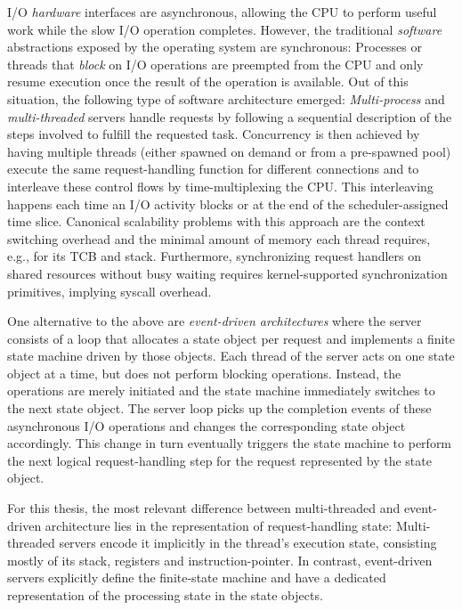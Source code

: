 \documentclass[12pt,a4paper]{book}
\begin{document}
I/O \emph{hardware} interfaces are asynchronous, allowing the CPU to perform useful work while the slow I/O operation completes.
However, the traditional \emph{software} abstractions exposed by the operating system are synchronous:
Processes or threads that \emph{block} on I/O operations are preempted from the CPU and only resume execution once the result of the operation is available.
Out of this situation, the following type of software architecture emerged:
\emph{Multi-process} and \emph{multi-threaded} servers handle requests by following a sequential description of the steps involved to fulfill the requested task.
Concurrency is then achieved by having multiple threads (either spawned on demand or from a pre-spawned pool) execute the same request-handling function for different connections and to interleave these control flows by time-multiplexing the CPU.
This interleaving happens each time an I/O activity blocks or at the end of the scheduler-assigned time slice.
Canonical scalability problems with this approach are the context switching overhead and the minimal amount of memory each thread requires, e.g., for its TCB and stack.
Furthermore, synchronizing request handlers on shared resources without busy waiting requires kernel-supported synchronization primitives, implying syscall overhead.~\cite{flashwebsrv,c10k,andersonThreads,seda}

One alternative to the above are \emph{event-driven architectures} where the server consists of a loop that allocates a state object per request and implements a finite state machine driven by those objects.
Each thread of the server acts on one state object at a time, but does not perform blocking operations.
Instead, the operations are merely initiated and the state machine immediately switches to the next state object.
The server loop picks up the completion events of these asynchronous I/O operations and changes the corresponding state object accordingly.
This change in turn eventually triggers the state machine to perform the next logical request-handling step for the request represented by the state object.~\cite{flashwebsrv,seda,c10k}

For this thesis, the most relevant difference between multi-threaded and event-driven architecture lies in the representation of request-handling state:
Multi-threaded servers encode it implicitly in the thread's execution state, consisting mostly of its stack, registers and instruction-pointer.
In contrast, event-driven servers explicitly define the finite-state machine and have a dedicated representation of the processing state in the state objects.
\end{document}

